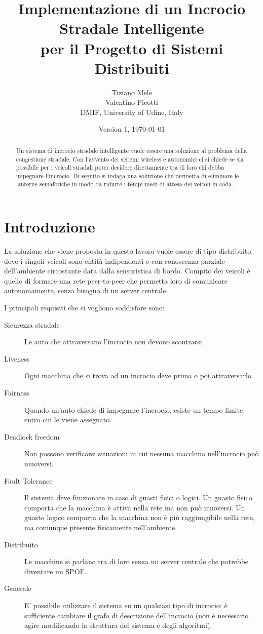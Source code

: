 \documentclass{memoir}
\title{Implementazione di un Incrocio Stradale Intelligente\\per il Progetto di
  Sistemi Distribuiti}
\author{Tiziano Mele\\Valentino Picotti\\DMIF, University of Udine, Italy}
\date{Version 1, \today}
\begin{document}
\maketitle
\begin{abstract}
  Un sistema di incrocio stradale intelligente vuole essere una soluzione al
  problema della congestione stradale. Con l'avvento dei sistemi wireless e
  autonomici ci si chiede se sia possibile per i veicoli stradali poter decidere
  direttamente tra di loro chi debba impegnare l'incrocio. Di seguito si indaga
  una soluzione che permetta di eliminare le lanterne semaforiche in modo da
  ridurre i tempi medi di attesa dei veicoli in coda.
\end{abstract}

\chapter{Introduzione}\label{ch:intro}

La soluzione che viene proposta in questo lavoro vuole essere di tipo
distribuito, dove i singoli veicoli sono entità indipendenti e con conoscenza
parziale dell'ambiente circostante data dalla sensoristica di bordo. Compito dei
veicoli è quello di formare una rete peer-to-peer che permetta loro di
comunicare autonomamente, senza bisogno di un server centrale.

I principali requisiti che si vogliono soddisfare sono:
\begin{description}
\item[Sicurezza stradale] Le auto che attraversano l'incrocio non devono
  scontrarsi.
\item[Liveness] Ogni macchina che si trova ad un incrocio deve prima o poi
  attraversarlo.
\item[Fairness] Quando un'auto chiede di impegnare l'incrocio, esiste un tempo
  limite entro cui le viene assegnato.
\item[Deadlock freedom] Non possono verificarsi situazioni in cui nessuna
  macchina nell'incrocio può muoversi.
\item [Fault Tolerance] Il sistema deve funzionare in caso di guasti fisici o
  logici. Un guasto fisico comporta che la macchina è attiva nella rete ma non
  può muoversi. Un guasto logico comporta che la macchina non è più
  raggiungibile nella rete, ma comunque presente fisicamente nell'ambiente.
\item [Distribuito] Le macchine si parlano tra di loro senza un server centrale
  che potrebbe diventare un SPOF.
\item [Generale] E' possibile utilizzare il sistema su un qualsiasi tipo di
  incrocio: è sufficiente cambiare il grafo di descrizione dell'incrocio (non è
  necessario agire modificando la struttura del sistema e degli algoritmi).
\end{description}
\end{document}
